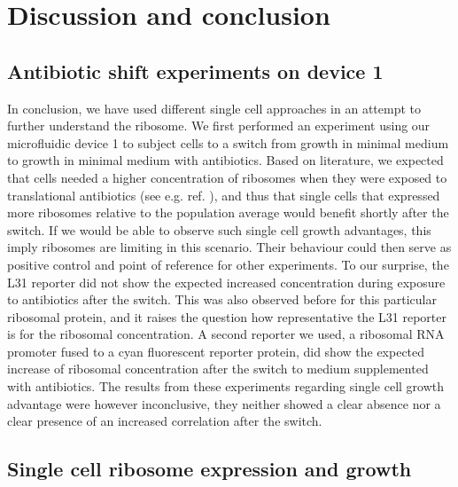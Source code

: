 \section{Discussion and conclusion}


\subsection{Antibiotic shift experiments on device 1}

In conclusion, we have used different single cell approaches in an attempt to further understand the ribosome.
%
We first performed an experiment using our microfluidic device 1 to subject cells to a switch from growth in minimal medium to growth in minimal medium with antibiotics.
Based on literature, we expected that cells needed a higher concentration of ribosomes when they were exposed to translational antibiotics (see e.g. ref. \cite{You2013}), and thus that single cells that expressed more ribosomes relative to the population average would benefit shortly after the switch.
%
If we would be able to observe such single cell growth advantages, this  imply 
ribosomes are limiting in this scenario.
Their behaviour could then serve 
as positive control and point of reference for other experiments. 
%
To our surprise, the L31 reporter did not show the expected increased concentration during exposure to antibiotics after the switch.
%
This was also observed before \cite{Walker2016t} for this particular ribosomal protein, and it
raises the question how representative the L31 reporter is for the ribosomal concentration.
%
A second reporter we used, a ribosomal RNA promoter fused to a cyan fluorescent reporter protein, did show the expected increase of ribosomal concentration after the switch to medium supplemented with antibiotics.
%
The results from these experiments regarding single cell growth advantage were however inconclusive, they neither showed a clear absence nor a clear presence of an increased correlation after the switch.

\subsection{Single cell ribosome expression and growth}

